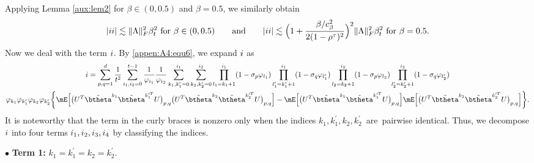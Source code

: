 Applying Lemma \ref{aux:lem2} for $\beta\in(0,0.5)$ and $\beta=0.5$, we similarly obtain
\begin{equation}\label{appen:A4:equ8a}
|\uppercase\expandafter{\romannumeral2}|\lesssim \|\Lambda\|_F^2\beta_t^2 \text{ for } \beta\in(0,0.5)\quad\quad \text{and}\quad\quad|\uppercase\expandafter{\romannumeral2}|\lesssim \Big(1+\frac{\beta/c_{\beta}^2}{2(1-\rho^\tau)^2}\Big)^2 \|\Lambda\|_F^2\beta_t^2 \text{ for }\beta = 0.5.
\end{equation}
Now we deal with the term $\uppercase\expandafter{\romannumeral1}$. By \eqref{appen:A4:equ6}, we expand $\uppercase\expandafter{\romannumeral1}$ as
\begin{multline*}
\uppercase\expandafter{\romannumeral1}= \sum_{p,q=1}^d\frac{1}{t^2} \sum_{i_1, i_2=0}^{t-1} \frac{1}{\varphi_{i_1}} \frac{1}{\varphi_{i_2}} \sum_{k_1,k_1^{\prime}=0}^{i_1} \sum_{k_2,k_2^{\prime}=0}^{i_2} \prod_{l_1=k_1+1}^{i_1}(1- \sigma_p\varphi_{l_1}) \prod_{l_1^{\prime}=k_1^{\prime}+1}^{i_1} (1-\sigma_q\varphi_{l_1^{\prime}}) \prod_{l_2=k_2+1}^{i_2}(1-\sigma_p\varphi_{l_2} ) \prod_{l_2^{\prime}=k_2^{\prime}+1}^{i_2}(1- \sigma_q\varphi_{l_2^{\prime}})\\
\varphi_{k_1}\varphi_{k_1^{\prime}}
\varphi_{k_2}\varphi_{k_2^{\prime}} \bigg\{\mE\Big[\big(U^T \tilde{\btheta}^{k_1}\tilde{\btheta}^{k_1^{\prime T}}U\big)_{p,q}\big(U^T \tilde{\btheta}^{k_2}\tilde{\btheta}^{k_2^{\prime T}}U\big)_{p,q}\Big]-\mE\Big[\big(U^T \tilde{\btheta}^{k_1}\tilde{\btheta}^{k_1^{\prime T}}U\big)_{p,q}\Big]\mE\Big[\big(U^T \tilde{\btheta}^{k_2}\tilde{\btheta}^{k_2^{\prime T}}U\big)_{p,q}\Big]\bigg\}.
\end{multline*}
It is noteworthy that the term in the curly braces is nonzero only when the indices $k_1,k_1^\prime,k_2,k_2^\prime$~are~pairwise identical. Thus, we decompose $\uppercase\expandafter{\romannumeral1}$ into four terms $\uppercase\expandafter{\romannumeral1}_1, \uppercase\expandafter{\romannumeral1}_2, \uppercase\expandafter{\romannumeral1}_3, \uppercase\expandafter{\romannumeral1}_4$ by classifying the indices.

\vskip0.3cm
\noindent$\bullet$ \textbf{Term 1:} $k_1=k_1^{\prime}=k_2=k_2^{\prime}$.

